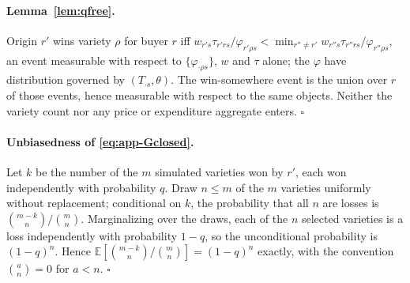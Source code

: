 \paragraph{Lemma~\ref{lem:qfree}.} Origin $r'$ wins variety $\rho$ for buyer $r$ iff
$w_{r's}\tau_{r'rs}/\varphi_{r'\rho s}<\min_{r''\neq r'}w_{r''s}\tau_{r''rs}/\varphi_{r''\rho s}$,
an event measurable with respect to $\{\varphi_{\cdot\rho s}\}$, $w$ and $\tau$ alone; the
$\varphi$ have distribution governed by $(T_{\cdot s},\theta)$. The win-somewhere event is the
union over $r$ of those events, hence measurable with respect to the same objects. Neither the
variety count nor any price or expenditure aggregate enters. \hfill$\square$

\paragraph{Unbiasedness of \eqref{eq:app-Gclosed}.} Let $k$ be the number of the $m$ simulated
varieties won by $r'$, each won independently with probability $q$. Draw $n\le m$ of the $m$
varieties uniformly without replacement; conditional on $k$, the probability that all $n$ are
losses is $\binom{m-k}{n}/\binom{m}{n}$. Marginalizing over the draws, each of the $n$ selected
varieties is a loss independently with probability $1-q$, so the unconditional probability is
$(1-q)^{n}$. Hence $\mathbb{E}[\binom{m-k}{n}/\binom{m}{n}]=(1-q)^{n}$ exactly, with the convention
$\binom{a}{n}=0$ for $a<n$. \hfill$\square$
